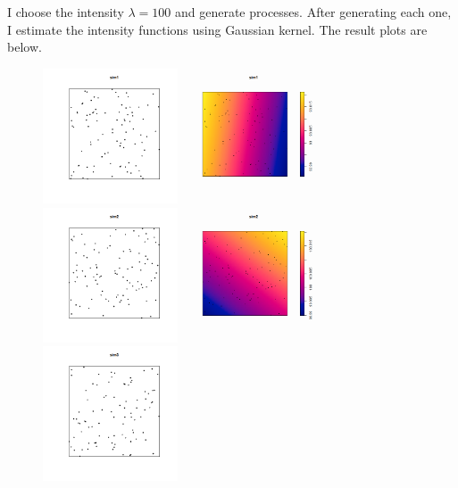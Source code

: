 \documentclass{article}
\begin{document}
I choose the intensity $\lambda=100$ and generate processes.
After generating each one, I estimate the intensity functions using Gaussian kernel.
The result plots are below.

\begin{figure}[!h]
    \centering
    \includegraphics[width=4cm]{prob2_sim1_scatterplot.png}
    \includegraphics[width=4cm]{prob2_sim1_ker.png}
    \includegraphics[width=4cm]{prob2_sim2_scatterplot.png}
    \includegraphics[width=4cm]{prob2_sim2_ker.png} \\
    \includegraphics[width=4cm]{prob2_sim3_scatterplot.png}

\end{figure}
\end{document}
